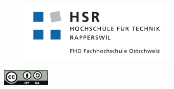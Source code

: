 \documentclass[12pt,oneside,a4paper,parskip]{scrartcl}
\title{\TITLE}
\author{\AUTHOR \\ \EMAIL}
\begin{document}
\begin{titlepage}
  \maketitle
  \thispagestyle{empty} %
  \vfill
  \begin{figure}[!htbp]
    \centering
    \includegraphics[width=300px]{hsr_logo.pdf}
  \end{figure}
\end{titlepage}

\setcounter{page}{1}
\tableofcontents

\vfill
\begin{center}
  \includegraphics[width=90px]{cc_by-sa.pdf}
\end{center}
\newpage

\end{document}
